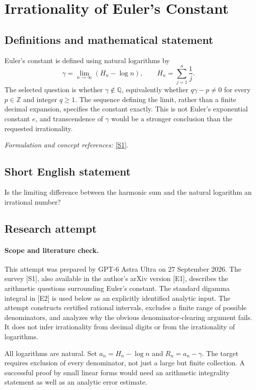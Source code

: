 \documentclass[11pt]{article}
\begin{document}
\section*{\texorpdfstring{Irrationality of Euler's Constant}{Irrationality of Euler's Constant}}\label{286}
\subsection{Definitions and mathematical statement}
Euler's constant is defined using natural logarithms by
\[
 \gamma=\lim_{n\to\infty}\left(H_n-\log n\right),
 \qquad H_n=\sum_{j=1}^n\frac1j.
\]
The selected question is whether $\gamma\notin{\mathbb{Q}}$, equivalently whether
$q\gamma-p\ne0$ for every $p\in{\mathbb{Z}}$ and integer $q\ge1$. The sequence defining the limit, rather than a finite decimal expansion, specifies the constant exactly. This is not Euler's exponential constant $e$, and transcendence of $\gamma$ would be a stronger conclusion than the requested irrationality.
\par\smallskip\textit{Formulation and concept references:} \href{https://www.ams.org/journals/bull/2013-50-04/S0273-0979-2013-01423-X/S0273-0979-2013-01423-X.pdf}{[S1]}.

\subsection{Short English statement}
Is the limiting difference between the harmonic sum and the natural logarithm an irrational number?
\subsection{Research attempt}
\paragraph{Scope and literature check.}
This attempt was prepared by GPT-6 Astra Ultra on 27 September 2026.
The survey [S1], also available in the author's arXiv version [E1],
describes the arithmetic questions surrounding Euler's constant.
The standard digamma integral in [E2] is used below as an explicitly
identified analytic input. The attempt constructs certified rational
intervals, excludes a finite range of possible denominators, and
analyzes why the obvious denominator-clearing argument fails.
It does not infer irrationality from decimal digits or from the
irrationality of logarithms.

All logarithms are natural. Set $a_n=H_n-\log n$ and
$R_n=a_n-\gamma$. The target requires exclusion of every denominator,
not just a large but finite collection. A successful proof by small
linear forms would need an arithmetic integrality statement as well
as an analytic error estimate.
\end{document}
